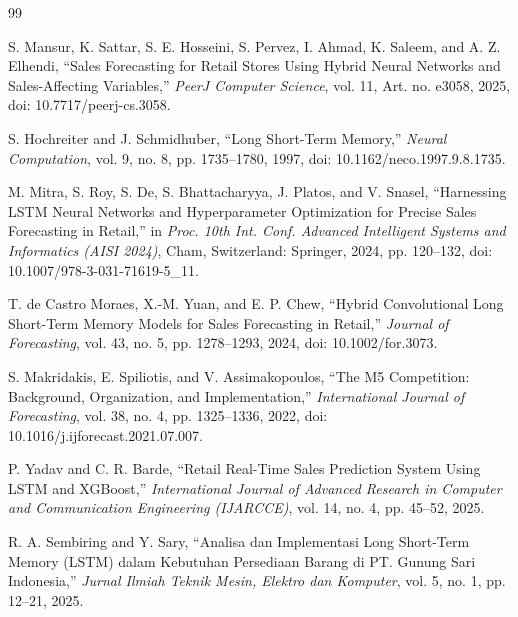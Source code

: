 \documentclass[10pt,a4paper]{article}
\begin{document}
\begin{thebibliography}{99}
\fontsize{8pt}{9.8pt}\selectfont
\setlength{\itemsep}{0.5pt}
\setlength{\parskip}{0pt}

S. Mansur, K. Sattar, S. E. Hosseini, S. Pervez, I. Ahmad, K. Saleem, and A. Z. Elhendi, ``Sales Forecasting for Retail Stores Using Hybrid Neural Networks and Sales-Affecting Variables,'' \textit{PeerJ Computer Science}, vol. 11, Art. no. e3058, 2025, doi: 10.7717/peerj-cs.3058.

S. Hochreiter and J. Schmidhuber, ``Long Short-Term Memory,'' \textit{Neural Computation}, vol. 9, no. 8, pp. 1735--1780, 1997, doi: 10.1162/neco.1997.9.8.1735.

M. Mitra, S. Roy, S. De, S. Bhattacharyya, J. Platos, and V. Snasel, ``Harnessing LSTM Neural Networks and Hyperparameter Optimization for Precise Sales Forecasting in Retail,'' in \textit{Proc. 10th Int. Conf. Advanced Intelligent Systems and Informatics (AISI 2024)}, Cham, Switzerland: Springer, 2024, pp. 120--132, doi: 10.1007/978-3-031-71619-5\_11.

T. de Castro Moraes, X.-M. Yuan, and E. P. Chew, ``Hybrid Convolutional Long Short-Term Memory Models for Sales Forecasting in Retail,'' \textit{Journal of Forecasting}, vol. 43, no. 5, pp. 1278--1293, 2024, doi: 10.1002/for.3073.

S. Makridakis, E. Spiliotis, and V. Assimakopoulos, ``The M5 Competition: Background, Organization, and Implementation,'' \textit{International Journal of Forecasting}, vol. 38, no. 4, pp. 1325--1336, 2022, doi: 10.1016/j.ijforecast.2021.07.007.

P. Yadav and C. R. Barde, ``Retail Real-Time Sales Prediction System Using LSTM and XGBoost,'' \textit{International Journal of Advanced Research in Computer and Communication Engineering (IJARCCE)}, vol. 14, no. 4, pp. 45--52, 2025.

R. A. Sembiring and Y. Sary, ``Analisa dan Implementasi Long Short-Term Memory (LSTM) dalam Kebutuhan Persediaan Barang di PT. Gunung Sari Indonesia,'' \textit{Jurnal Ilmiah Teknik Mesin, Elektro dan Komputer}, vol. 5, no. 1, pp. 12--21, 2025.


\end{thebibliography}
\end{document}
